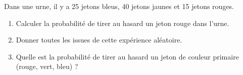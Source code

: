Dans une urne, il y a 25 jetons bleus, 40 jetons jaunes et 15 jetons rouges. 
\begin{enumerate}
    \item Calculer la probabilité de tirer au hasard un jeton rouge dans l'urne.
    \item Donner toutes les issues de cette expérience aléatoire.
    \item Quelle est la probabilité de tirer au hasard un jeton de couleur primaire (rouge, vert, bleu) ?
\end{enumerate}
